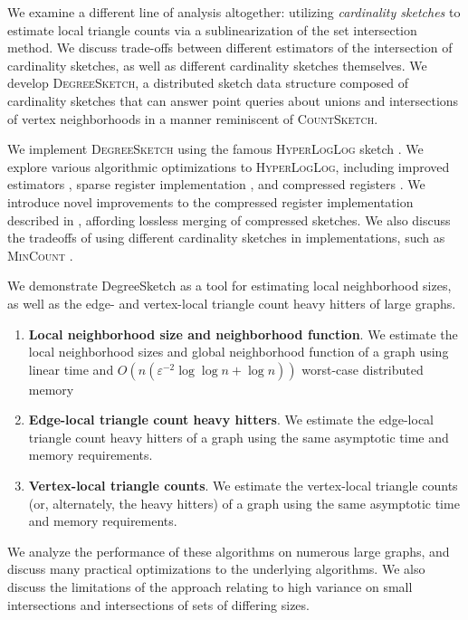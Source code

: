 \documentclass[10]{report}
\newcommand{\algoname}[1]{\textnormal{\textsc{#1}}}
\begin{document}
We examine a different line of analysis altogether: utilizing \emph{cardinality sketches} to estimate local triangle counts via a sublinearization of the set intersection method.
We discuss trade-offs between different estimators of the intersection of cardinality sketches, as well as different cardinality sketches themselves.
We develop \algoname{DegreeSketch}, a distributed sketch data structure composed of cardinality sketches that can answer point queries about unions and intersections of vertex neighborhoods in a manner reminiscent of \algoname{CountSketch}.

We implement \algoname{DegreeSketch} using the famous \algoname{HyperLogLog} sketch \cite{flajolet2007hyperloglog}. 
We explore various algorithmic optimizations to \algoname{HyperLogLog}, including improved estimators \cite{heule2013hyperloglog, qin2016loglog, lang2017back, ertl2017new}, sparse register implementation \cite{heule2013hyperloglog}, and compressed registers \cite{xiao2017better}.
We introduce novel improvements to the compressed register implementation described in \cite{xiao2017better}, affording lossless merging of compressed sketches.
We also discuss the tradeoffs of using different cardinality sketches in implementations, such as \algoname{MinCount} \cite{giroire2009order}.

We demonstrate DegreeSketch as a tool for estimating local neighborhood sizes, as well as the edge- and vertex-local triangle count heavy hitters of large graphs. 
%
\begin{enumerate}
	\item \textbf{Local neighborhood size and neighborhood function}. We estimate the local neighborhood sizes and global neighborhood function of a graph using linear time and $O(n (\varepsilon^{-2} \log\log n + \log n))$ worst-case distributed memory
	\item \textbf{Edge-local triangle count heavy hitters}. We estimate the edge-local triangle count heavy hitters of a graph using the same asymptotic time and memory requirements.
	\item \textbf{Vertex-local triangle counts}. We estimate the vertex-local triangle counts (or, alternately, the heavy hitters) of a graph using the same asymptotic time and memory requirements.
\end{enumerate}
%
We analyze the performance of these algorithms on numerous large graphs, and discuss many practical optimizations to the underlying algorithms. 
We also discuss the limitations of the approach relating to high variance on small intersections and intersections of sets of differing sizes.
\end{document}
